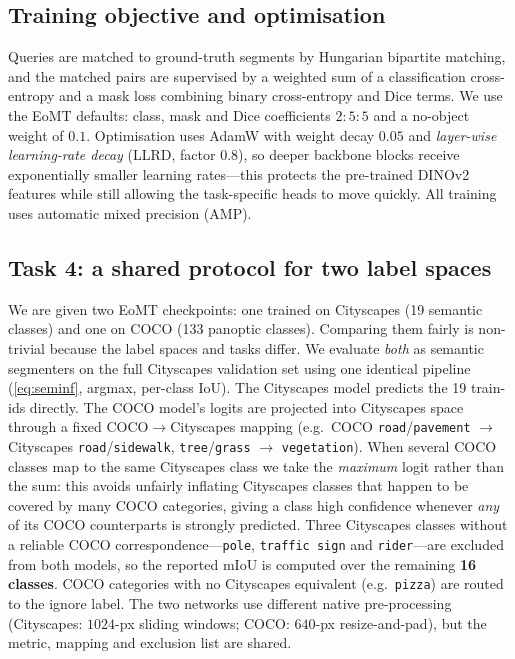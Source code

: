 \subsection{Training objective and optimisation}
Queries are matched to ground-truth segments by Hungarian bipartite
matching, and the matched pairs are supervised by a weighted sum of a
classification cross-entropy and a mask loss combining binary cross-entropy
and Dice terms. We use the EoMT defaults: class, mask and Dice coefficients
$2{:}5{:}5$ and a no-object weight of $0.1$. Optimisation uses AdamW with
weight decay $0.05$ and \emph{layer-wise learning-rate decay} (LLRD, factor
$0.8$), so deeper backbone blocks receive exponentially smaller learning
rates---this protects the pre-trained DINOv2 features while still allowing the
task-specific heads to move quickly. All training uses automatic mixed
precision (AMP).

\subsection{Task 4: a shared protocol for two label spaces}
\label{sec:method-task4}
We are given two EoMT checkpoints: one trained on Cityscapes (19 semantic
classes) and one on COCO (133 panoptic classes). Comparing them fairly is
non-trivial because the label spaces and tasks differ. We evaluate \emph{both}
as semantic segmenters on the full Cityscapes validation set using one
identical pipeline (\cref{eq:seminf}, argmax, per-class IoU). The Cityscapes
model predicts the 19 train-ids directly. The COCO model's logits are
projected into Cityscapes space through a fixed COCO$\rightarrow$Cityscapes
mapping (e.g.\ COCO \texttt{road}/\texttt{pavement} $\rightarrow$ Cityscapes
\texttt{road}/\texttt{sidewalk}, \texttt{tree}/\texttt{grass}
$\rightarrow$ \texttt{vegetation}). When several COCO classes map to the same
Cityscapes class we take the \emph{maximum} logit rather than the sum: this
avoids unfairly inflating Cityscapes classes that happen to be covered by many
COCO categories, giving a class high confidence whenever \emph{any} of its
COCO counterparts is strongly predicted. Three Cityscapes classes without a
reliable COCO correspondence---\texttt{pole}, \texttt{traffic sign} and
\texttt{rider}---are excluded from both models, so the reported mIoU is
computed over the remaining \textbf{16 classes}. COCO categories with no
Cityscapes equivalent (e.g.\ \texttt{pizza}) are routed to the ignore label.
The two networks use different native pre-processing (Cityscapes:
$1024$-px sliding windows; COCO: $640$-px resize-and-pad), but the metric,
mapping and exclusion list are shared.


